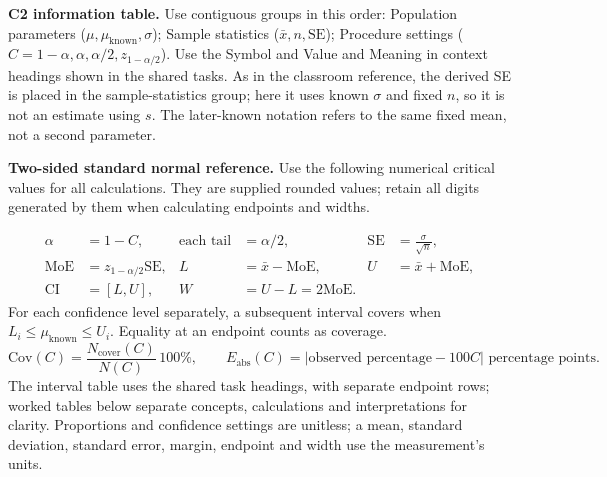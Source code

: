 \textbf{C2 information table.} Use contiguous groups in this order: Population parameters ($\mu,\mu_{\mathrm{known}},\sigma$); Sample statistics ($\bar x,n,\mathrm{SE}$); Procedure settings ($C=1-\alpha,\alpha,\alpha/2,z_{1-\alpha/2}$). Use the Symbol and Value and Meaning in context headings shown in the shared tasks. As in the classroom reference, the derived SE is placed in the sample-statistics group; here it uses known $\sigma$ and fixed $n$, so it is not an estimate using $s$. The later-known notation refers to the same fixed mean, not a second parameter.

\textbf{Two-sided standard normal reference.} Use the following numerical critical values for all calculations. They are supplied rounded values; retain all digits generated by them when calculating endpoints and widths.
\par\noindent\begin{minipage}{\linewidth}
\begin{minipage}[t]{.49\linewidth}\vspace{0pt}
\end{minipage}\hfill
\begin{minipage}[t]{.49\linewidth}\vspace{0pt}
\end{minipage}
\end{minipage}\par
\[
\begin{aligned}
\alpha&=1-C,& \text{each tail}&=\alpha/2,&\mathrm{SE}&=\frac{\sigma}{\sqrt n},\\
\mathrm{MoE}&=z_{1-\alpha/2}\mathrm{SE},&L&=\bar x-\mathrm{MoE},&U&=\bar x+\mathrm{MoE},\\
\mathrm{CI}&=[L,U],&W&=U-L=2\mathrm{MoE}.&&
\end{aligned}
\]
For each confidence level separately, a subsequent interval covers when
$L_i\leq\mu_{\mathrm{known}}\leq U_i$. Equality at an endpoint counts as coverage.
\[
\mathrm{Cov}(C)=\frac{N_{\mathrm{cover}}(C)}{N(C)}\,100\%,\qquad
E_{\mathrm{abs}}(C)=|\text{observed percentage}-100C|\text{ percentage points}.
\]
The interval table uses the shared task headings, with separate endpoint rows; worked tables below separate concepts, calculations and interpretations for clarity. Proportions and confidence settings are unitless; a mean, standard deviation, standard error, margin, endpoint and width use the measurement's units.

